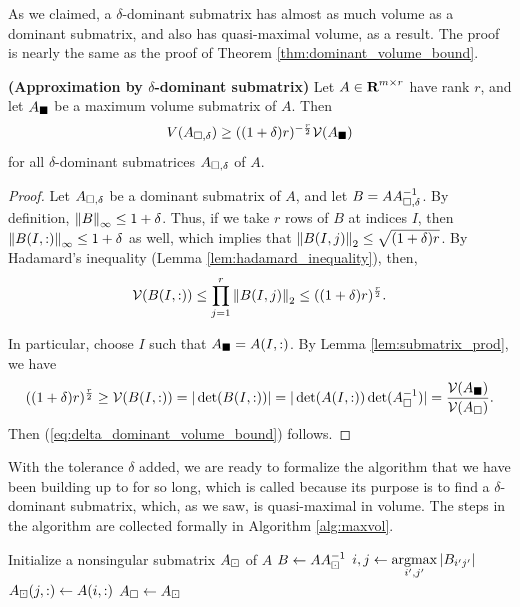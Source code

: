 \documentclass{article}
\begin{document}
	As we claimed, a $\delta$-dominant submatrix has almost as much volume as a dominant submatrix, and also has quasi-maximal volume, as a result. The proof is nearly the same as the proof of Theorem \ref{thm:dominant_volume_bound}.
	
	\begin{thm} \textnormal{\bf(Approximation by $\delta$-dominant submatrix)}
		\label{thm:delta_dominant_volume_bound}
		Let $A \in \textnormal{\bf R}^{m\times r}$ have rank $r$, and let $A_\blacksquare$ be a maximum volume submatrix of $A$. Then
		\begin{equation}
			\label{eq:delta_dominant_volume_bound}
			V(A_{\square,\delta}) \ge ((1 + \delta)r)^{-\frac{r}{2}}\mathcal{V}(A_\blacksquare)
		\end{equation}
		for all $\delta$-dominant submatrices $A_{\square,\delta}$ of $A$.
	\end{thm}
	
	\begin{proof}
		Let $A_{\square,\delta}$ be a dominant submatrix of $A$, and let $B = AA_{\square,\delta}^{-1}$. By definition, $\left\lVert B \right\rVert_\infty \le 1 + \delta$. Thus, if we take $r$ rows of $B$ at indices $I$, then $\left\lVert B(I,:) \right\rVert_\infty\le 1 + \delta$ as well, which implies that $\left\lVert B(I,j) \right\rVert_2 \le \sqrt{(1+\delta)r}$. By Hadamard's inequality (Lemma \ref{lem:hadamard_inequality}), then,
		\begin{equation}
			\mathcal{V}(B(I,:)) \le \prod_{j=1}^r \left\lVert B(I,j) \right\rVert_2 \le ((1+\delta)r)^\frac{r}{2}.
		\end{equation}
		
		In particular, choose $I$ such that $A_\blacksquare = A(I,:)$. By Lemma \ref{lem:submatrix_prod}, we have 
		\begin{equation}
			((1+\delta)r)^{\frac{r}{2}} \ge \mathcal{V}(B(I,:)) = |\det(B(I,:))| = |\det(A(I,:))\det(A_\square^{-1})| = \frac{\mathcal{V}(A_\blacksquare)}{\mathcal{V}(A_\square)}.
		\end{equation}
		Then (\ref{eq:delta_dominant_volume_bound}) follows.
	\end{proof}
	
	
	With the tolerance $\delta$ added, we are ready to formalize the algorithm that we have been building up to for so long, which is called \maxvol{} because its purpose is to find a $\delta$-dominant submatrix, which, as we saw, is quasi-maximal in volume. The steps in the algorithm are collected formally in Algorithm \ref{alg:maxvol}.
	
	\begin{algorithm}
		\caption{\maxvol{}}\label{alg:maxvol}
		Initialize a nonsingular submatrix $A_\boxdot$ of $A$\;
		 {
			$B \gets AA_\boxdot^{-1}$\;
			$i,j\gets \operatorname*{argmax}\limits_{i',j'} |B_{i'j'}|$\;
			 {
				$A_\boxdot(j, :) \gets A(i,:)$\;
			}
		}
		$A_\square \gets A_\boxdot$\;
	\end{algorithm}
	
\end{document}
